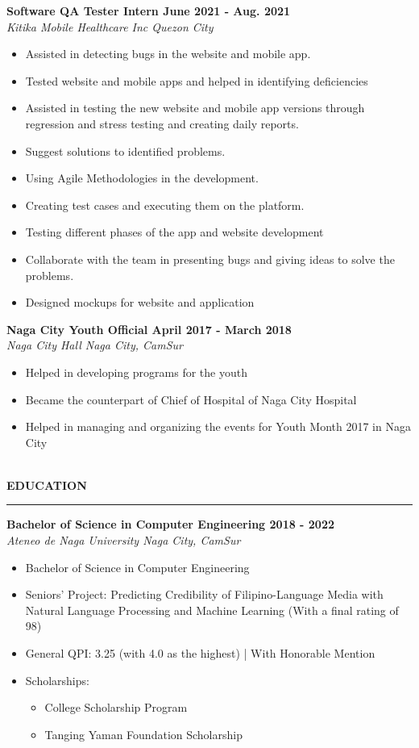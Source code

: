 \documentclass{amsbook}
\begin{document}
\noindent
\textbf{Software QA Tester Intern \hfill June 2021 \@- Aug. 2021}\\
\textit{Kitika Mobile Healthcare Inc \hfill Quezon City}
\begin{itemize}
    \item Assisted in detecting bugs in the website and mobile app.
    \item Tested  website and mobile apps and helped  in identifying deficiencies
    \item Assisted in testing the new website and mobile app versions through regression and stress testing and creating daily reports.
    \item Suggest solutions to identified problems.
    \item Using Agile Methodologies in the development.
    \item Creating test cases and executing them on the platform.
    \item Testing different phases of the app and website development
    \item Collaborate with the team in presenting bugs and giving ideas to solve the problems.
    \item Designed mockups for website and application
\end{itemize}
\noindent
\textbf{Naga City Youth Official \hfill April 2017 \@- March 2018}\\
\textit{Naga City Hall \hfill Naga City, CamSur}
\begin{itemize}
  \item Helped in developing programs for the youth
  \item Became the counterpart of Chief of Hospital of Naga City Hospital
  \item Helped in managing and organizing the events for Youth Month 2017 in Naga City
  
\end{itemize}
\noindent
\\
\textbf{EDUCATION}
\\
\rule{\textwidth}{1pt} 
\textbf{Bachelor of Science in Computer Engineering \hfill 2018 \@- 2022}\\
\textit{Ateneo de Naga University \hfill Naga City, CamSur}
\begin{itemize}
    \item Bachelor of Science in Computer Engineering
    \item Seniors' Project\@: Predicting Credibility of Filipino-Language Media with Natural Language Processing and Machine Learning (With a final rating of 98)
    \item General QPI\@: 3.25 (with 4.0 as the highest)  | With Honorable Mention
    \item Scholarships:
    \begin{itemize}
        \item College Scholarship Program
        \item Tanging Yaman Foundation Scholarship
    \end{itemize}
    
\end{itemize}
\end{document}
